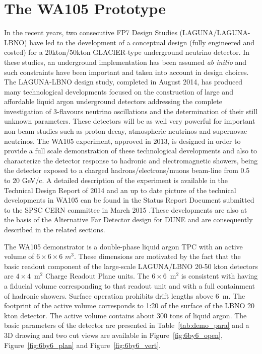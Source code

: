 \section{The WA105 Prototype} 
\label{sec:proto-cern-double}

 In the recent years, two consecutive FP7 Design Studies (LAGUNA/LAGUNA-LBNO) have led to the development of a conceptual design (fully engineered and costed) for a 20kton/50kton GLACIER-type underground neutrino detector. In these studies, an underground implementation has been assumed {\it ab initio}
and such constraints have been important and taken into account in design choices. The LAGUNA-LBNO design study, completed in August 2014, has produced many technological developments focused on the construction of  large and affordable liquid argon underground detectors addressing the complete investigation of 3-flavours neutrino oscillations and the determination of their still unknown parameters. These detectors will be as well very powerful for important non-beam studies such as proton decay, atmospheric neutrinos and supernovae neutrinos. The WA105 experiment, approved in 2013, is designed in order to provide a full scale demonstration of these technological developments and also to characterize the detector response to hadronic and electromagnetic showers, being the detector exposed to a charged hadrons/electrons/muons beam-line from 0.5 to 20 GeV/c. A detailed description of the experiment is available in the Technical Design Report of 2014  \cite{WA105_TDR} and an up to date picture of the technical developments in WA105 can be found in the Status Report Document submitted to the SPSC CERN committee in  March 2015 \cite{WA105_SREP}.These developments are also at the basis of the Alternative Far Detector design for DUNE and are consequently described in the related sections.

The WA105 demonstrator is a double-phase liquid argon TPC with an active volume of $6\times 6\times 6$ $m^3$. These dimensions are motivated by the fact that the  basic readout component of the large-scale LAGUNA/LBNO 20-50 kton detectors are $4\times 4$~m$^2$ Charge Readout Plane units. 
The $6\times6$~m$^2$ is consistent with having a fiducial volume corresponding to that readout unit and with a full containment of hadronic showers. 
Surface operation prohibits drift lengths above 6~m. The footprint of the active volume corresponds to 1:20 of the surface of the LBNO 20 kton detector. The active volume contains about 300 tons of liquid argon. The basic parameters of the detector are presented in Table~\ref{tab:demo_para} and a 3D drawing and two cut views are available in Figure~\ref{fig:6by6_open},  Figure~\ref{fig:6by6_plan} and  Figure~\ref{fig:6by6_vert}.

